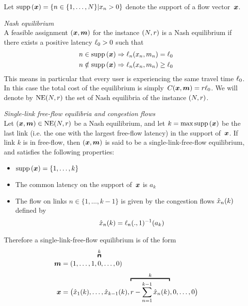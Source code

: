 Let $\textup{supp} \left( \boldsymbol {x} \right) = \{ n \in \{1, \dots, N\} | x_n > 0\}$ denote the support of a flow vector~$\boldsymbol {x}$.
\begin{definition}\emph{Nash equilibrium}\\
\label{def:NashEq}
A feasible assignment $(\boldsymbol {x}, \boldsymbol {m})$ for the instance $(N, r)$ is a Nash equilibrium if there exists a positive latency $\ell_0 > 0$ such that
\begin{equation}
\begin{aligned}
n \in \textup{supp} \left( \boldsymbol {x} \right) \Rightarrow \ell_n(x_n, m_n) = \ell_0 \\
n \notin \textup{supp} \left( \boldsymbol {x} \right) \Rightarrow \ell_n(x_n, m_n) \geq \ell_0
\end{aligned}
\end{equation}
This means in particular that every user is experiencing the same travel time $\ell_0$. In this case the total cost of the equilibrium is simply~$C(\boldsymbol {x}, \boldsymbol {m}) = r \ell_0$. We will denote by $\textup{NE} (N, r)$ the set of Nash equilibria of the instance $(N, r)$.
\end{definition}

\begin{definition}{\emph{Single-link free-flow equilibria and congestion flows}\\}
\label{def:CongFlow}
Let $(\boldsymbol {x}, \boldsymbol {m}) \in \textup{NE} (N, r)$ be a Nash equilibrium, and let $k = \max \textup{supp} \left( \boldsymbol {x} \right)$ be the last link (i.e. the one with the largest free-flow latency) in the support of~$\boldsymbol {x}$. If link $k$ is in free-flow, then $(\boldsymbol {x}, \boldsymbol {m})$ is said to be a single-link-free-flow equilibrium, and satisfies the following properties:
\begin{itemize}
\item $\textup{supp} \left( \boldsymbol {x} \right) = \{1, \dots, k\}$
\item The common latency on the support of~$\boldsymbol {x}$ is $a_k$
\item The flow on links $n \in \{1, \dots, k-1\}$ is given by the congestion flows $\hat{x}_{n} ( k )$ defined by
\[
\hat{x}_{n} ( k ) = \ell_n(.,1)^{-1}(a_k)
\]
\end{itemize}
Therefore a single-link-free-flow equilibrium is of the form
\begin{align*}
\modeV &= (1, \dots, 1, \overbracBig{0}{k}, \dots, 0) \\
\flowV &= \big( \cFlow{1}{k}, \dots, \cFlow{k-1}{k}, \overbracBig{\demand - \sum_{n=1}^{k-1}\cFlow{n}{k}}{k}, 0, \dots, 0 \big)
\end{align*}
\end{definition}

